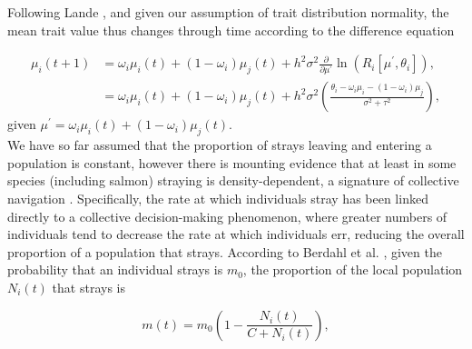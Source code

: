 \documentclass{revtex4}
\begin{document}
Following Lande \citep{Lande:1976ga}, and given our assumption of trait distribution normality, the mean trait value thus changes through time according to the difference equation

\begin{align}
  \label{eq:mu}
  \mu_i(t+1) &= \omega_i\mu_i(t) + (1-\omega_i)\mu_j(t) + h^2\sigma^2\frac{\partial}{\partial \mu^\prime}\ln\left(R_i[\mu^\prime,\theta_i] \right), \\ \nonumber
  &= \omega_i\mu_i(t) + (1-\omega_i)\mu_j(t) + h^2\sigma^2\left(\frac{\theta_i - \omega_i\mu_i - (1-\omega_i)\mu_j}{\sigma^2+\tau^2} \right),
\end{align}
given $\mu^\prime = \omega_i \mu_i(t)+ (1-\omega_i)\mu_j(t)$.
\\

\noindent We have so far assumed that the proportion of strays leaving and entering a population is constant, however there is mounting evidence that at least in some species (including salmon) straying is density-dependent, a signature of collective navigation \citep{Berdahl:2014bl,Berdahl:2017uu}.
Specifically, the rate at which individuals stray has been linked directly to a collective decision-making phenomenon, where greater numbers of individuals tend to decrease the rate at which individuals err, reducing the overall proportion of a population that strays.
According to Berdahl et al. \citep{Berdahl:2016dx}, given the probability that an individual strays is $m_0$, the proportion of the local population $N_i(t)$ that strays is

\begin{equation}
  m(t) = m_0\left(1- \frac{N_i(t)}{C+N_i(t)}\right),
  \label{eq:ddm}
\end{equation}
\end{document}
